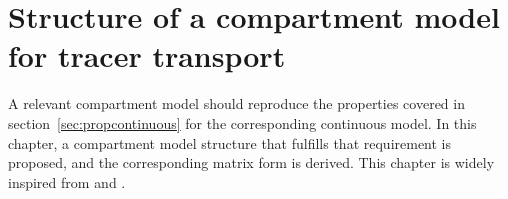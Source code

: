 \chapter{Structure of a compartment model for tracer transport} \label{chap:compartment}
A relevant compartment model should reproduce the properties covered in section~\ref{sec:propcontinuous} for the corresponding continuous model. In this chapter, a compartment model structure that fulfills that requirement is proposed, and the corresponding matrix form is derived. This chapter is widely inspired from \cite{deleersnijder2014compartment} and \cite{delhez2010compartment}.




